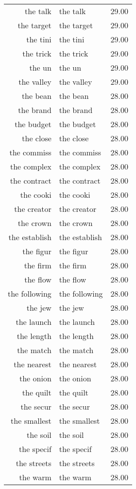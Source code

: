 \begin{table}[ht]
\begin{tabular}{rlr}
  the talk & the talk & 29.00 \\ 
  the target & the target & 29.00 \\ 
  the tini & the tini & 29.00 \\ 
  the trick & the trick & 29.00 \\ 
  the un & the un & 29.00 \\ 
  the valley & the valley & 29.00 \\ 
  the bean & the bean & 28.00 \\ 
  the brand & the brand & 28.00 \\ 
  the budget & the budget & 28.00 \\ 
  the close & the close & 28.00 \\ 
  the commiss & the commiss & 28.00 \\ 
  the complex & the complex & 28.00 \\ 
  the contract & the contract & 28.00 \\ 
  the cooki & the cooki & 28.00 \\ 
  the creator & the creator & 28.00 \\ 
  the crown & the crown & 28.00 \\ 
  the establish & the establish & 28.00 \\ 
  the figur & the figur & 28.00 \\ 
  the firm & the firm & 28.00 \\ 
  the flow & the flow & 28.00 \\ 
  the following & the following & 28.00 \\ 
  the jew & the jew & 28.00 \\ 
  the launch & the launch & 28.00 \\ 
  the length & the length & 28.00 \\ 
  the match & the match & 28.00 \\ 
  the nearest & the nearest & 28.00 \\ 
  the onion & the onion & 28.00 \\ 
  the quilt & the quilt & 28.00 \\ 
  the secur & the secur & 28.00 \\ 
  the smallest & the smallest & 28.00 \\ 
  the soil & the soil & 28.00 \\ 
  the specif & the specif & 28.00 \\ 
  the streets & the streets & 28.00 \\ 
  the warm & the warm & 28.00 \\ 

\end{tabular}
\end{table}
